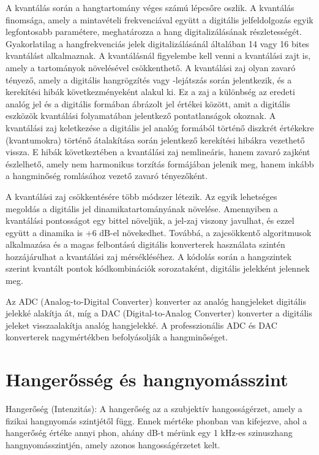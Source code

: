 A kvantálás során a hangtartomány véges számú lépcsőre oszlik. 
A kvantálás finomsága, amely a mintavételi frekvenciával együtt a digitális jelfeldolgozás 
egyik legfontosabb paramétere, meghatározza a hang digitalizálásának részletességét. Gyakorlatilag a 
hangfrekvenciás jelek digitalizálásánál általában 14 vagy 16 bites kvantálást alkalmaznak. 
A kvantálásnál figyelembe kell venni a kvantálási zajt is, amely a tartományok növelésével csökkenthető.
A kvantálási zaj olyan zavaró tényező, amely a digitális hangrögzítés vagy -lejátszás során jelentkezik, 
és a kerekítési hibák következményeként alakul ki. Ez a zaj a különbség az eredeti analóg jel és a 
digitális formában ábrázolt jel értékei között, amit a digitális eszközök kvantálási folyamatában jelentkező pontatlanságok okoznak.
A kvantálási zaj keletkezése a digitális jel analóg formából történő diszkrét értékekre (kvantumokra) 
történő átalakítása során jelentkező kerekítési hibákra vezethető vissza. 
E hibák következtében a kvantálási zaj nemlineáris, hanem zavaró zajként észlelhető, 
amely nem harmonikus torzítás formájában jelenik meg, hanem inkább a hangminőség romlásához vezető zavaró tényezőként.

A kvantálási zaj csökkentésére több módszer létezik. Az egyik lehetséges megoldás a 
digitális jel dinamikatartományának növelése. Amennyiben a kvantálási pontosságot 
egy bittel növeljük, a jel-zaj viszony javulhat, és ezzel együtt a dinamika is +6 dB-el növekedhet. 
Továbbá, a zajcsökkentő algoritmusok alkalmazása és a magas felbontású digitális konverterek használata szintén hozzájárulhat a kvantálási zaj mérsékléséhez.
A kódolás során a hangszintek szerint kvantált pontok kódkombinációk sorozataként, digitális jelekként jelennek meg.

Az ADC (Analog-to-Digital Converter) konverter az analóg hangjeleket digitális jelekké alakítja át, míg a DAC (Digital-to-Analog Converter) 
konverter a digitális jeleket visszaalakítja analóg hangjelekké. 
A professzionális ADC és DAC konverterek nagymértékben befolyásolják a hangminőséget.
\section{Hangerősség és hangnyomásszint} %
Hangerőség (Intenzitás):
A hangerőség az a szubjektív hangosságérzet, amely a fizikai hangnyomás szintjétől függ. 
Ennek mértéke phonban van kifejezve, ahol a hangerőség értéke annyi phon, ahány dB-t mérünk 
egy 1 kHz-es szinuszhang hangnyomásszintjén, amely azonos hangosságérzetet kelt.

